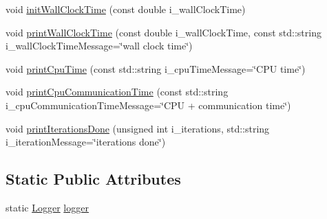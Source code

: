 \begin{DoxyCompactItemize}
\item 
void \hyperlink{classtools_1_1Logger_ab1bb09a74580560b36c19979d88ef3bc}{init\-Wall\-Clock\-Time} (const double i\-\_\-wall\-Clock\-Time)
\item 
void \hyperlink{classtools_1_1Logger_a432c4dbdbc532bc792cd0d4b30b3b42e}{print\-Wall\-Clock\-Time} (const double i\-\_\-wall\-Clock\-Time, const std\-::string i\-\_\-wall\-Clock\-Time\-Message=\char`\"{}wall clock time\char`\"{})
\item 
void \hyperlink{classtools_1_1Logger_a8b355903b8fc885d4328a589ab4fed7f}{print\-Cpu\-Time} (const std\-::string i\-\_\-cpu\-Time\-Message=\char`\"{}C\-P\-U time\char`\"{})
\item 
void \hyperlink{classtools_1_1Logger_a13b3ab066b8e33c1013f7eb3ea080fcd}{print\-Cpu\-Communication\-Time} (const std\-::string i\-\_\-cpu\-Communication\-Time\-Message=\char`\"{}C\-P\-U + communication time\char`\"{})
\item 
void \hyperlink{classtools_1_1Logger_a2e9f836ab40bfde976770aa711b8547d}{print\-Iterations\-Done} (unsigned int i\-\_\-iterations, std\-::string i\-\_\-iteration\-Message=\char`\"{}iterations done\char`\"{})
\end{DoxyCompactItemize}
\subsection*{Static Public Attributes}
\begin{DoxyCompactItemize}
\item 
static \hyperlink{classtools_1_1Logger}{Logger} \hyperlink{classtools_1_1Logger_afb2f149ebfe806842ebed18a0ce199a0}{logger}
\end{DoxyCompactItemize}


